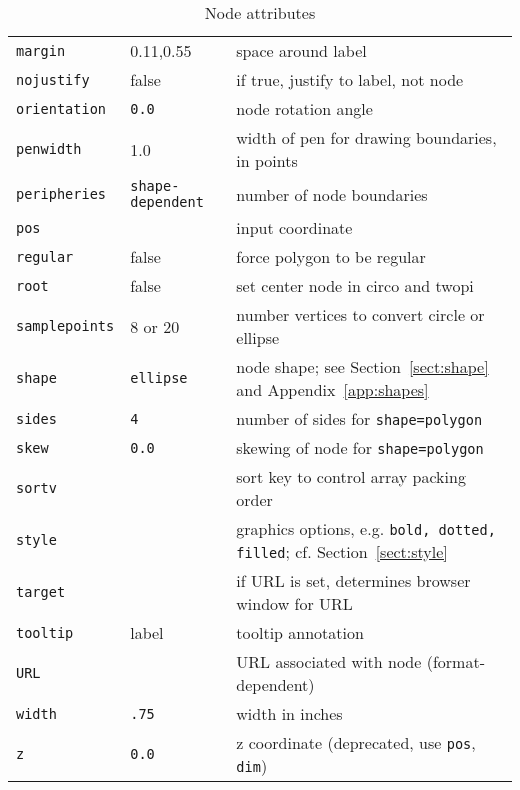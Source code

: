 \documentclass[11pt]{article}
\begin{document}
\begin{table}[p]
\begin{tabular}[t]{|l|l|p{3.0in}|}
{\tt margin} & 0.11,0.55 & space around label \\
{\tt nojustify} & false & if true, justify to label, not node \\
{\tt orientation} & {\tt 0.0} & node rotation angle \\
{\tt penwidth} & 1.0 & width of pen for drawing boundaries, in points \\
{\tt peripheries} & {\tt shape-dependent} & number of node boundaries \\
{\tt pos} &  & input coordinate \\
{\tt regular} & false & force polygon to be regular \\
{\tt root} & false & set center node in circo and twopi \\
{\tt samplepoints} & 8 or 20 & number vertices to convert circle or ellipse \\
{\tt shape} & {\tt ellipse} & node shape; see Section~\ref{sect:shape} and
Appendix~\ref{app:shapes}\\
{\tt sides} & {\tt 4} & number of sides for {\tt shape=polygon} \\
{\tt skew} & {\tt 0.0} & skewing of node for {\tt shape=polygon} \\
{\tt sortv} & & sort key to control array packing order \\
{\tt style} & & graphics options, e.g. {\tt bold, dotted, filled};
cf. Section~\ref{sect:style} \\ 
{\tt target} & & if URL is set, determines browser window for URL \\
{\tt tooltip} & label & tooltip annotation \\
{\tt URL} & & URL associated with node (format-dependent) \\
{\tt width} & {\tt .75} & width in inches \\
{\tt z} & {\tt 0.0} & z coordinate (deprecated, use {\tt pos}, {\tt dim}) \\
\hline
\end{tabular}
\caption{Node attributes}
\label{tab:nattr}
\end{table}
\end{document}
